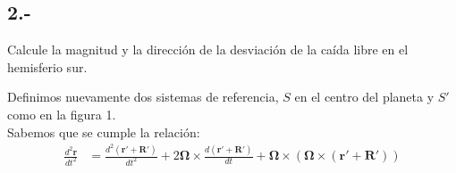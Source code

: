 \documentclass{article}
\begin{document}
\subsection*{2.- }
Calcule la magnitud y la dirección de la desviación de la caída
libre en el hemisferio sur.
\begin{tcolorbox}
    Definimos nuevamente dos sistemas de referencia, $S$ en el centro del planeta y $S'$ como en la figura 1. \\
    Sabemos que se cumple la relación: 
    \begin{align*}
        \frac{d^2\bm{r}}{dt^2}  
        &=\frac{d^2(\bm{r' + R'})}{dt^2}
        + 2\bm{\Omega} \times \frac{d(\bm{r' + R'})}{dt}
        + \bm{\Omega} \times (\bm{\Omega} \times (\bm{r' + R'})) \\
    \end{align*}
    \end{tcolorbox}
\end{document}
